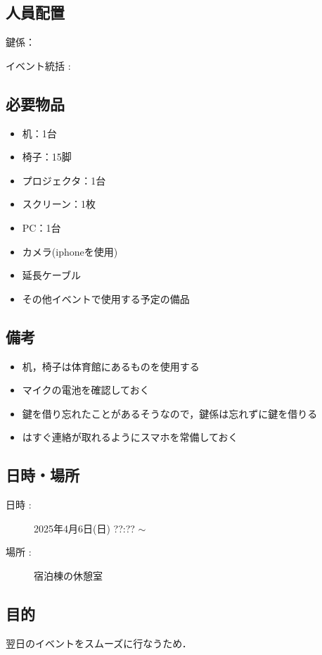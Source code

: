 \subsection{人員配置}
鍵係：   \par
イベント統括 :   

\subsection{必要物品}
\begin{itemize}
  \item 机：1台
  \item 椅子：15脚
  \item プロジェクタ：1台
  \item スクリーン：1枚
  \item PC：1台
  \item カメラ(iphoneを使用)
  \item 延長ケーブル
  \item その他イベントで使用する予定の備品
\end{itemize}

\subsection{備考}
\begin{itemize}
  \item 机，椅子は体育館にあるものを使用する
  \item マイクの電池を確認しておく
  \item 鍵を借り忘れたことがあるそうなので，鍵係は忘れずに鍵を借りる
  \item   はすぐ連絡が取れるようにスマホを常備しておく
\end{itemize}

\subsection{日時・場所}
\begin{description}
  \item[日時 :] 2025年4月6日(日)  ??:?? $\sim$
  \item[場所 :] 宿泊棟の休憩室
\end{description}

\subsection{目的}
翌日のイベントをスムーズに行なうため．

